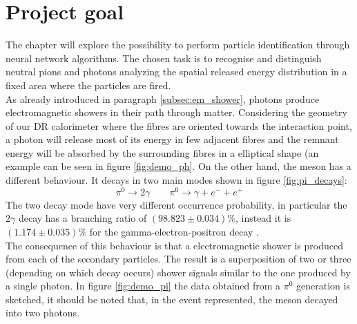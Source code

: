 \section{Project goal}
The chapter will explore the possibility to perform particle identification through neural network algorithms. The chosen task is to recognise and distinguish neutral pions and photons analyzing the spatial released energy distribution in a fixed area where the particles are fired.\\
As already introduced in paragraph \ref{subsec:em_shower}, photons produce electromagnetic showers in their path through matter. Considering the geometry of our DR calorimeter where the fibres are oriented towards the interaction point, a photon will release most of its energy in few adjacent fibres and the remnant energy will be absorbed by the surrounding fibres in a elliptical shape (an example can be seen in figure \ref{fig:demo_ph}.
On the other hand, the meson has a different behaviour. It decays in two main modes shown in figure \ref{fig:pi_decays}:
\begin{equation}
    \pi^0\xrightarrow{} 2\gamma \qquad \pi^0\xrightarrow{} \gamma + e^- + e^+
\end{equation}
The two decay mode have very different occurrence probability, in particular the $2\gamma$ decay has a branching ratio of $(98.823\pm0.034)\%$, instead it is $(1.174\pm0.035)\%$ for the gamma-electron-positron decay \cite{pi_decay}.\\
The consequence of this behaviour is that a electromagnetic shower is produced from each of the secondary particles. The result is a superposition of two or three (depending on which decay occurs) shower signals similar to the one produced by a single photon. In figure \ref{fig:demo_pi} the data obtained from a $\pi^0$ generation is sketched, it should be noted that, in the event represented, the meson decayed into two photons.\\

